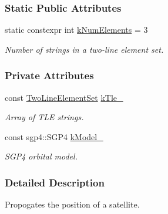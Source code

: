 \subsubsection*{Static Public Attributes}
\begin{DoxyCompactItemize}
\item 
\mbox{\label{classosse_1_1collaborate_1_1_platform_orbit_a50b5b9308298c2a17db06a92b82abe85}} 
static constexpr int \hyperlink{classosse_1_1collaborate_1_1_platform_orbit_a50b5b9308298c2a17db06a92b82abe85}{k\+Num\+Elements} = 3
\begin{DoxyCompactList}\small\item\em Number of strings in a two-\/line element set. \end{DoxyCompactList}\end{DoxyCompactItemize}
\subsubsection*{Private Attributes}
\begin{DoxyCompactItemize}
\item 
\mbox{\label{classosse_1_1collaborate_1_1_platform_orbit_a997543f1020cfa000918286b774c4aa8}} 
const \hyperlink{classosse_1_1collaborate_1_1_platform_orbit_aeb5892b2982d26547cead0beebc81fe0}{Two\+Line\+Element\+Set} \hyperlink{classosse_1_1collaborate_1_1_platform_orbit_a997543f1020cfa000918286b774c4aa8}{k\+Tle\+\_\+}
\begin{DoxyCompactList}\small\item\em Array of T\+LE strings. \end{DoxyCompactList}\item 
\mbox{\label{classosse_1_1collaborate_1_1_platform_orbit_a5653e1ae6b7a6274f0ecfdb423b25606}} 
const sgp4\+::\+S\+G\+P4 \hyperlink{classosse_1_1collaborate_1_1_platform_orbit_a5653e1ae6b7a6274f0ecfdb423b25606}{k\+Model\+\_\+}
\begin{DoxyCompactList}\small\item\em S\+G\+P4 orbital model. \end{DoxyCompactList}\end{DoxyCompactItemize}


\subsubsection{Detailed Description}
Propogates the position of a satellite. 

